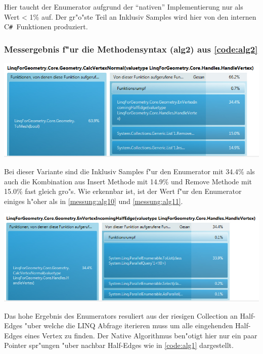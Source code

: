 \documentclass[pagesize, paper=a4, fontsize=12pt,titlepage=true, headings=small, headnosepline, abstractoff, liststotoc, nochapterprefix, plainheadsepline]{scrreprt}
\newcommand{\CSS}{C\texttt{\# }}
\begin{document}
Hier taucht der Enumerator aufgrund der "`nativen"' Implementierung nur als Wert < 1\% auf. Der gr"o"ste Teil an Inklusiv Samples wird hier von den internen \CSS Funktionen produziert.

\subsubsection{Messergebnis f"ur die Methodensyntax (alg2) aus \ref{code:alg2}}
\begin{minipage}[c][8cm]{\linewidth}
\includegraphics[width=\linewidth]{../Messung/linq-alg2-0}
\label{messung:alg20}
\end{minipage}
Bei dieser Variante sind die Inklusiv Samples f"ur den Enumerator mit 34.4\% als auch die Kombination aus Insert Methode mit 14.9\% und Remove Methode mit 15.0\% fast gleich gro"s. Wie erkennbar ist, ist der Wert f"ur den Enumerator einiges h"oher als in \ref{messung:alg10} und \ref{messung:alg11}.
\begin{minipage}[c][8cm]{\linewidth}
\includegraphics[width=\linewidth]{../Messung/linq-alg2-1}
\label{messung:alg21}
\end{minipage}

Das hohe Ergebnis des Enumerators resuliert aus der riesigen Collection an Half-Edges "uber welche die LINQ Abfrage iterieren muss um alle eingehenden Half-Edges eines Vertex zu finden. Der Native Algorithmus ben"otigt hier nur ein paar Pointer spr"ungen "uber nachbar Half-Edges wie in \ref{code:alg1} dargestellt. \label{ref:linqNativeSampling1}
\end{document}
